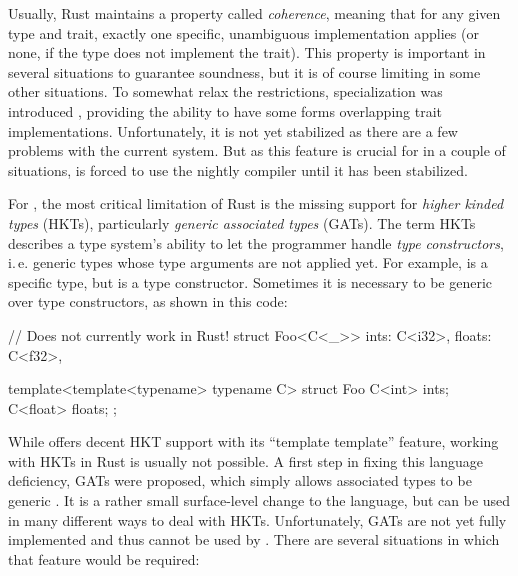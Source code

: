 Usually, Rust maintains a property called \emph{coherence}, meaning that for any given type and trait, exactly one specific, unambiguous implementation applies (or none, if the type does not implement the trait).
This property is important in several situations to guarantee soundness, but it is of course limiting in some other situations.
To somewhat relax the restrictions, specialization was introduced \cite{rfc1210}, providing the ability to have some forms overlapping trait implementations.
Unfortunately, it is not yet stabilized as there are a few problems with the current system.
But as this feature is crucial for  in a couple of situations,  is forced to use the nightly compiler until it has been stabilized.

\vfill

For , the most critical limitation of Rust is the missing support for \emph{higher kinded types} (HKTs), particularly \emph{generic associated types} (GATs).
The term HKTs describes a type system's ability to let the programmer handle \emph{type constructors}, i.\,e. generic types whose type arguments are not applied yet.
For example,  is a specific type, but  is a type constructor.
Sometimes it is necessary to be generic over type constructors, as shown in this code:

\vspace{5mm}
\begin{minipage}{0.47\textwidth}
  \begin{rustcode}
    // Does not currently work in Rust!
    struct Foo<C<_>> {
        ints: C<i32>,
        floats: C<f32>,
    }
  \end{rustcode}
\end{minipage}
\begin{minipage}{0.51\textwidth}
  \begin{cppcode}
    template<template<typename> typename C>
    struct Foo {
        C<int> ints;
        C<float> floats;
    };
  \end{cppcode}
\end{minipage}

\newpage
While \cpp offers decent HKT support with its \enquote{template template} feature, working with HKTs in Rust is usually not possible.
A first step in fixing this language deficiency, GATs were proposed, which simply allows associated types to be generic \cite{rfc1598}.
It is a rather small surface-level change to the language, but can be used in many different ways to deal with HKTs.
Unfortunately, GATs are not yet fully implemented and thus cannot be used by .
There are several situations in which that feature would be required:

